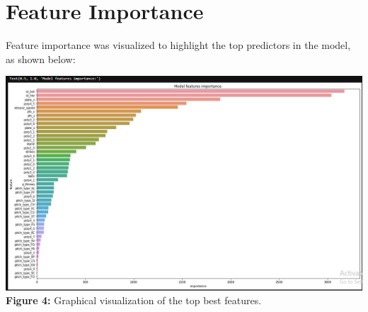 \documentclass[12pt]{article}
\begin{document}
\section*{Feature Importance}
Feature importance was visualized to highlight the top predictors in the model, as shown below:

\begin{center}
    \includegraphics[width=\textwidth]{feature_importance.png} %
    \textbf{\\Figure 4:} Graphical visualization of the top best features.
\end{center}
\end{document}
